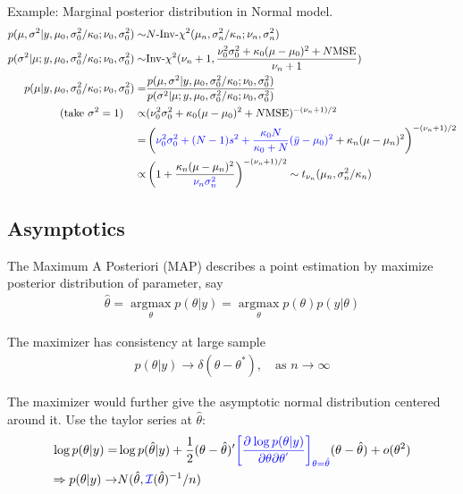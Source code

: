 \begin{itemize}[topsep=2pt,itemsep=0pt]
    Example: Marginal posterior distribution in Normal model.
    \begin{align}
        p(\mu ,\sigma ^2|y,\mu _0, \sigma _0^2/\kappa_0; \nu _0, \sigma _0^2)\sim&N\text{-}\mathrm{ Inv }\text{-}\chi^2(\mu _n, \sigma _n^2/\kappa _n; \nu _n,\sigma _n^2)\\
        p(\sigma ^2|\mu ;y,\mu _0, \sigma _0^2/\kappa_0; \nu _0, \sigma _0^2)\sim & \mathrm{ Inv }\text{-}\chi^2(\nu _n+1, \dfrac{ \nu _0^2\sigma _0^2+\kappa _0(\mu -\mu _0)^2+ N\mathrm{ MSE }  }{ \nu _n+1 } )  \\
        p(\mu |y,\mu _0, \sigma _0^2/\kappa_0; \nu _0, \sigma _0^2)=&\dfrac{ p(\mu ,\sigma ^2|y,\mu _0, \sigma _0^2/\kappa_0; \nu _0, \sigma _0^2) }{ p(\sigma ^2| \mu ;y,\mu _0, \sigma _0^2/\kappa_0; \nu _0, \sigma _0^2) } \\
        (\text{take }\sigma ^2=1)\quad \propto&(\nu _0^2\sigma _0^2+\kappa _0(\mu -\mu _0)^2+ N\mathrm{ MSE } )^{-( \nu _n+1 )/2}\\
        =&\left( {\color{blue}\nu _0^2\sigma _0^2+(N-1)s^2+\dfrac{ \kappa _0N }{ \kappa _0+N }(\bar{y}-\mu _0)^2} + \kappa _n(\mu -\mu_n)^2  \right)^{-( \nu _n+1 )/2}\\
        \propto& \left(1+\dfrac{ \kappa _n(\mu -\mu _n)^2 }{ \color{blue}\nu _n\sigma _n^2 } \right)^{-( \nu _n+1 )/2}\sim t_{\nu _n}(\mu _n, \sigma _n^2/\kappa _n)
    \end{align}

\end{itemize}

    

\subsection{Asymptotics}
The Maximum A Posteriori (MAP) describes a point estimation by maximize posterior distribution of parameter, say
\begin{align}
    \hat{\theta }= \mathop{ \arg\max }\limits_{\theta } p(\theta |y)=\mathop{ \arg\max }\limits_{\theta }p(\theta )p(y|\theta )
\end{align}

The maximizer has consistency at large sample
\begin{align}
    p(\theta |y)\to \delta (\theta -\theta ^*),\quad \text{as }n\to \infty 
\end{align}

The maximizer would further give the asymptotic normal distribution centered around it. Use the taylor series at $ \hat{\theta } $:
\begin{align}
    \log p(\theta |y)=&\log p(\hat{\theta }|y)+\dfrac{ 1 }{ 2 } (\theta -\hat{\theta })'{\color{blue}\left[\dfrac{\partial^{} \log p(\theta |y) }{\partial \theta \partial\theta ^{'} }\right]_{\theta =\hat{\theta }}}(\theta -\hat{\theta })+o(\theta ^2) \\
    \Rightarrow p(\theta |y)\to& N(\hat{\theta }, {\color{blue}\mathcal{I}}(\hat{\theta })^{-1}/n)
\end{align}


